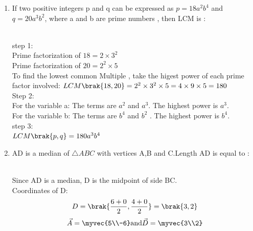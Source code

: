 \begin{enumerate}[label=\thesubsection.\arabic*, ref=\thesubsection.\theenumi]
\item
If two positive integers p and q can  be expressed as $p = 18a^2b^4$ and $q = 20a^3b^2 $, where a and b are prime numbers , then LCM  is :
\begin{enumerate}
\end{enumerate}
\solution
\\step 1:
 \\Prime factorization of $18 = 2\times3^2$
 \\Prime factorization of $20 = 2^2\times5$
 \\To find the lowest common Multiple , take the higest power of each prime factor involved:
 $LCM\brak{18,20} = 2^2\times3^2\times 5 = 4\times9\times5 = 180$
 \\Step 2:
 \\For the variable a: The terms are $a^2$ and $a^3 $. The highest power is $a^3$.
 \\For the variable b: The terms are $b^4$ and $b^2$ .
 The highest power is $b^4$.
 \\step 3:
 \\$LCM\brak{p,q} = 180a^3b^4$ 
\item
AD is a median of $\triangle ABC$ with vertices A,B and C.Length AD is equal to :
\begin{enumerate}
\end{enumerate}  
\solution
\\Since AD is a median, D is the midpoint of side BC.
\\Coordinates of D:
\begin{align}D = \brak{\frac{6 + 0}{2},\frac{4 + 0}{2}} = \brak{3,2}
\end{align}
\begin{align}
\vec{A} = \myvec{5\\-6} \text{and} \vec{D} = \myvec{3\\2} 

\end{align}
\end{enumerate}
